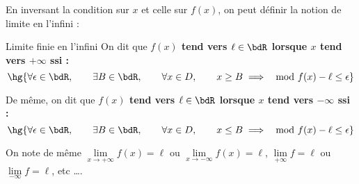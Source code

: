 \documentclass[a4paper,french,bookmarks]{article}
\begin{document}
\begin{enumerate}
{\begin{minipage}{0.4\textwidth}
        \end{minipage}
        
        En inversant la condition sur $x$ et celle sur $f(x)$, on peut définir la notion de limite en l'infini :
        
        \begin{definition*}{Limite finie en l'infini}{}
            On dit que \bf{$f(x)$ tend vers $\ell \in \bdR$ lorsque $x$ tend vers $+\infty$} ssi :
            \[ \hg{\forall \epsilon \in \bdR,\qquad \exists B \in \bdR,\qquad \forall x \in D,\qquad x \geq B \implies \mod{f(x) - \ell} \leq \epsilon} \]
            
            De même, on dit que \bf{$f(x)$ tend vers $\ell \in \bdR$ lorsque $x$ tend vers $-\infty$} ssi :
            \[ \hg{\forall \epsilon \in \bdR,\qquad \exists B \in \bdR,\qquad \forall x \in D,\qquad x \leq B \implies \mod{f(x) - \ell} \leq \epsilon} \]
        \end{definition*}
        
        On note de même $\lim\limits_{x \to +\infty} f(x) = \ell$ ou $\lim\limits_{x \to -\infty} f(x) = \ell$, $\lim\limits_{+\infty} f = \ell$ ou $\lim\limits_{-\infty} f = \ell$, etc \dots.
        
}
\end{enumerate}
\end{document}
